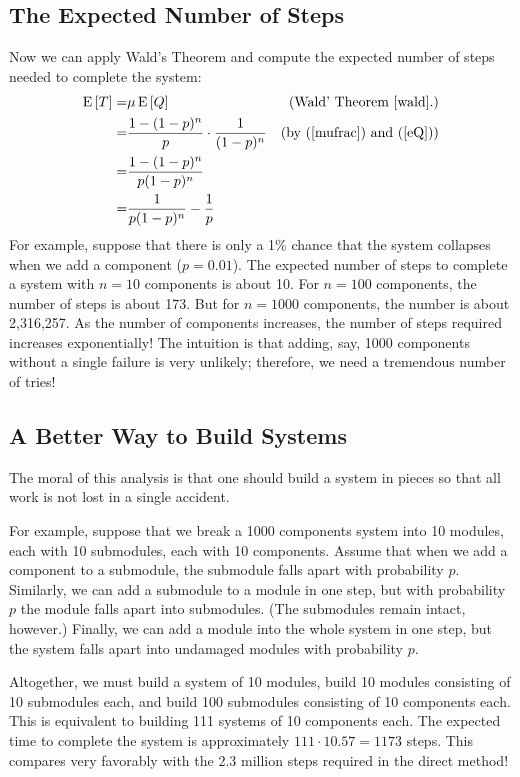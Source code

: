 \documentclass[11pt,twoside]{article}
\begin{document}
\subsection{The Expected Number of Steps} 

Now we can apply Wald's Theorem and compute the expected number of steps
needed to complete the system:
\begin{align*}
\mathop{\textup{E}}\nolimits\left[T\right]  = & \mu \mathop{\textup{E}}\nolimits\left[Q\right]  & \text{(Wald' Theorem~\ref{wald}.)}\\
            = & \frac{1 - (1-p)^n}{p}  \cdot \frac{1}{(1-p)^n} &
                   \text{(by~(\ref{mufrac}) and~(\ref{eQ}))}\\
            = & \frac{1 - (1-p)^n}{p (1-p)^n} \\
            = & \frac{1}{p (1-p)^n} - \frac{1}{p}\\
\end{align*}
For example, suppose that there is only a 1\% chance that the system
collapses when we add a component ($p = 0.01$).  The expected number
of steps to complete a system with $n = 10$ components is about
10.  For $n = 100$ components, the number of steps is about 173.
But for $n=1000$ components, the number is about 2,316,257.  As the
number of components increases, the number of steps required increases
exponentially!  The intuition is that adding, say, 1000 components
without a single failure is very unlikely; therefore, we need a
tremendous number of tries!


\subsection{A Better Way to Build Systems}

The moral of this analysis is that one should build a system in pieces
so that all work is not lost in a single accident.

For example, suppose that we break a 1000 components system into 10
modules, each with 10 submodules, each with 10 components.  Assume
that when we add a component to a submodule, the submodule falls apart
with probability $p$.  Similarly, we can add a submodule to a module
in one step, but with probability $p$ the module falls apart into
submodules.  (The submodules remain intact, however.)  Finally, we
can add a module into the whole system in one step, but the
system falls apart into undamaged modules with probability $p$.

Altogether, we must build a system of 10 modules, build 10 modules
consisting of 10 submodules each, and build 100 submodules consisting of
10 components each.  This is equivalent to building 111 systems of 10
components each.  The expected time to complete the system is
approximately $111 \cdot 10.57 = 1173$ steps.  This compares very
favorably with the 2.3 million steps required in the direct method!
\end{document}
